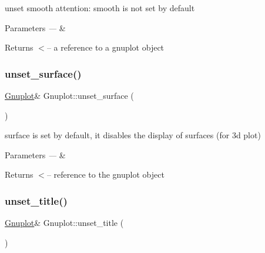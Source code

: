 unset smooth attention\+: smooth is not set by default 


\begin{DoxyParams}{Parameters}
{\em ---} & \\
\hline
\end{DoxyParams}
\begin{DoxyReturn}{Returns}
$<$-- a reference to a gnuplot object 
\end{DoxyReturn}
\mbox{\label{class_gnuplot_a4ebddacbec61aa3e7bc4b89f508ad621}} 
\subsubsection{\texorpdfstring{unset\+\_\+surface()}{unset\_surface()}}
{\footnotesize\ttfamily \mbox{\hyperlink{class_gnuplot}{Gnuplot}}\& Gnuplot\+::unset\+\_\+surface (\begin{DoxyParamCaption}{ }\end{DoxyParamCaption})\hspace{0.3cm}{\ttfamily [inline]}}

surface is set by default, it disables the display of surfaces (for 3d plot)


\begin{DoxyParams}{Parameters}
{\em ---} & ~\newline
 \\
\hline
\end{DoxyParams}
\begin{DoxyReturn}{Returns}
$<$-- reference to the gnuplot object 
\end{DoxyReturn}
\mbox{\label{class_gnuplot_aca0aeb1dc0ac8d7e68ba6a15a977be28}} 
\subsubsection{\texorpdfstring{unset\+\_\+title()}{unset\_title()}}
{\footnotesize\ttfamily \mbox{\hyperlink{class_gnuplot}{Gnuplot}}\& Gnuplot\+::unset\+\_\+title (\begin{DoxyParamCaption}{ }\end{DoxyParamCaption})\hspace{0.3cm}{\ttfamily [inline]}}



